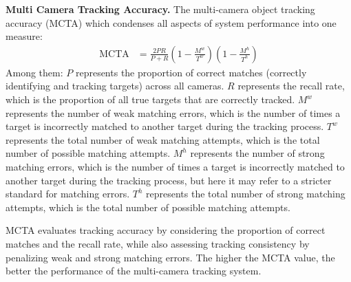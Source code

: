 \textbf{Multi Camera Tracking Accuracy.}
The multi-camera object tracking accuracy (MCTA) which condenses all aspects of system performance into one measure\cite{Alpher23b}:
\begin{align}
	\mathrm{MCTA} & = \frac{2 P R}{P+R}\left(1-\frac{M^{w}}{T^{w}}\right)\left(1-\frac{M^{h}}{T^{h}}\right)
\end{align}
Among them:
$P$ represents the proportion of correct matches (correctly identifying and tracking targets) across all cameras.  
$R$ represents the recall rate, which is the proportion of all true targets that are correctly tracked.  
$M^{w}$ represents the number of weak matching errors, which is the number of times a target is incorrectly matched to another target during the tracking process.  
$T^{w}$ represents the total number of weak matching attempts, which is the total number of possible matching attempts.  
$M^{h}$ represents the number of strong matching errors, which is the number of times a target is incorrectly matched to another target during the tracking process, but here it may refer to a stricter standard for matching errors.  
$T^{h}$ represents the total number of strong matching attempts, which is the total number of possible matching attempts.

MCTA evaluates tracking accuracy by considering the proportion of correct matches and the recall rate, while also assessing tracking consistency by penalizing weak and strong matching errors. 
The higher the MCTA value, the better the performance of the multi-camera tracking system.
